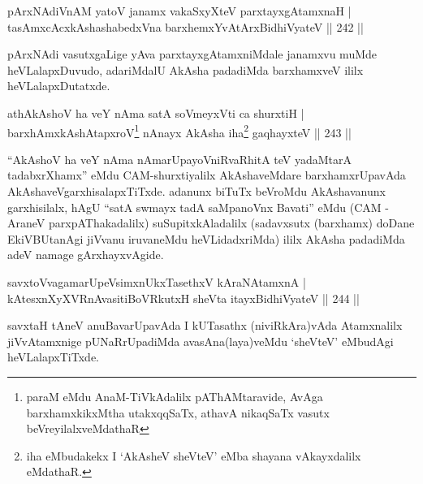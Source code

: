 \begin{shl}
pArxNAdiVnAM yatoV janamx vakaSxyXteV parxtayxgAtamxnaH |\\
tasAmxcAcx\s \s kAshashabedxVna barxhemxYvAtArxBidhiVyateV \hfill || 242 ||
\end{shl}

\begin{artha}
pArxNAdi vasutxgaLige yAva parxtayxgAtamxniMdale janamxvu muMde heVLalapxDuvudo, adariMdalU AkAsha padadiMda barxhamxveV ililx heVLalapxDutatxde.
\end{artha}


\begin{shl}
athA\s \s kAshoV ha veY nAma satA soVmeyxVti ca shurxtiH |\\
barxhAmxkAshAtapxroV\footnote{paraM eMdu AnaM-TiVkAdalilx pAThAMtaravide, AvAga  barxhamxkikxMtha utakxqqSaTx, athavA nikaqSaTx vasutx  beVreyilalxveMdathaR} nAnayx AkAsha iha\footnote{iha eMbudakekx I `AkAsheV sheVteV' eMba  shayana vAkayxdalilx eMdathaR.} gaqhayxteV \hfill || 243 ||
\end{shl}

\begin{artha}
``AkAshoV ha veY nAma nAmarUpayoVniRvaRhitA teV yadaMtarA tadabxrXhamx'' eMdu CAM-shurxtiyalilx  AkAshaveMdare barxhamxrUpavAda AkAshaveV\break garxhisalapxTiTxde. adanunx biTuTx beVroMdu AkAshavanunx garxhisilalx, hAgU ``satA swmayx tadA saMpanoVnx Bavati'' eMdu (CAM - AraneV parxpAThakadalilx) suSupitxkAladalilx (sadavxsutx (barxhamx) doDane EkiVBUtanAgi jiVvanu iruvaneMdu heVLidadxriMda) ililx AkAsha padadiMda adeV namage gArxhayxvAgide.
\end{artha}


\begin{shl}
savxtoVvagamarUpeV\s simxnUkxTasethxV kAraNAtamxnA |\\
kAtesxnXyXVRnAvasitiBoVRkutxH sheVta itayxBidhiVyateV \hfill || 244 ||
\end{shl}

\begin{artha}
savxtaH tAneV anuBavarUpavAda I kUTasathx (niviRkAra)vAda Atamxnalilx jiVvAtamxnige pUNaRrUpadiMda avasAna(laya)veMdu `sheVteV' eMbudAgi heVLalapxTiTxde.
\end{artha}

